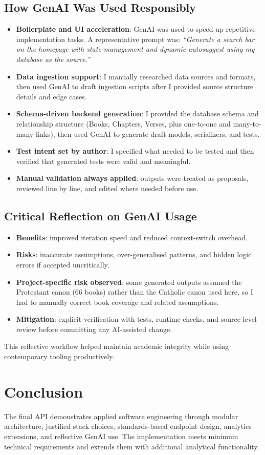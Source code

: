 \documentclass[11pt,a4paper]{article}
\begin{document}
\subsection*{How GenAI Was Used Responsibly}
\begin{itemize}[leftmargin=*]
	\item \textbf{Boilerplate and UI acceleration}: GenAI was used to speed up repetitive implementation tasks. A representative prompt was: \textit{``Generate a search bar on the homepage with state management and dynamic autosuggest using my database as the source.''}
	\item \textbf{Data ingestion support}: I manually researched data sources and formats, then used GenAI to draft ingestion scripts after I provided source structure details and edge cases.
	\item \textbf{Schema-driven backend generation}: I provided the database schema and relationship structure (Books, Chapters, Verses, plus one-to-one and many-to-many links), then used GenAI to generate draft models, serializers, and tests.
	\item \textbf{Test intent set by author}: I specified what needed to be tested and then verified that generated tests were valid and meaningful.
	\item \textbf{Manual validation always applied}: outputs were treated as proposals, reviewed line by line, and edited where needed before use.
\end{itemize}

\subsection*{Critical Reflection on GenAI Usage}
\begin{itemize}[leftmargin=*]
	\item \textbf{Benefits}: improved iteration speed and reduced context-switch overhead.
	\item \textbf{Risks}: inaccurate assumptions, over-generalised patterns, and hidden logic errors if accepted uncritically.
	\item \textbf{Project-specific risk observed}: some generated outputs assumed the Protestant canon (66 books) rather than the Catholic canon used here, so I had to manually correct book coverage and related assumptions.
	\item \textbf{Mitigation}: explicit verification with tests, runtime checks, and source-level review before committing any AI-assisted change.
\end{itemize}
This reflective workflow helped maintain academic integrity while using contemporary tooling productively.

\section{Conclusion}
The final API demonstrates applied software engineering through modular architecture, justified stack choices, standards-based endpoint design, analytics extensions, and reflective GenAI use. The implementation meets minimum technical requirements and extends them with additional analytical functionality.
\end{document}
